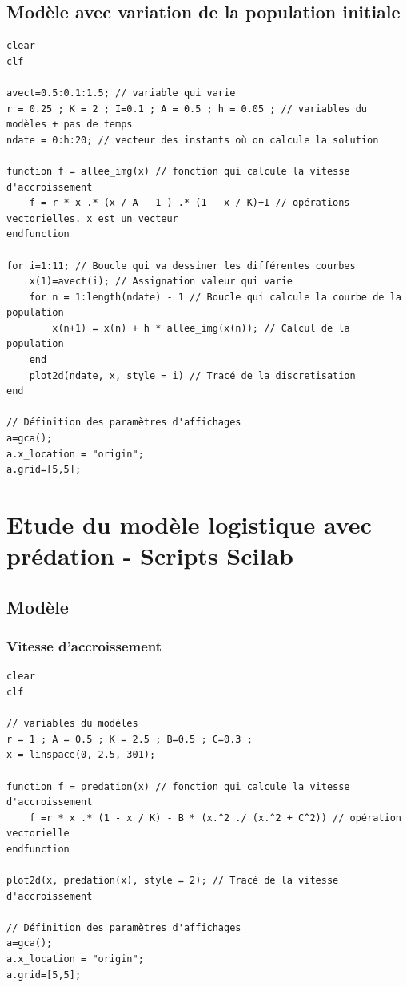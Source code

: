 \documentclass{article}
\begin{document}
\subsection{Modèle avec variation de la population initiale}

\begin{verbatim}
clear
clf

avect=0.5:0.1:1.5; // variable qui varie
r = 0.25 ; K = 2 ; I=0.1 ; A = 0.5 ; h = 0.05 ; // variables du modèles + pas de temps
ndate = 0:h:20; // vecteur des instants où on calcule la solution

function f = allee_img(x) // fonction qui calcule la vitesse d'accroissement
    f = r * x .* (x / A - 1 ) .* (1 - x / K)+I // opérations vectorielles. x est un vecteur
endfunction

for i=1:11; // Boucle qui va dessiner les différentes courbes
    x(1)=avect(i); // Assignation valeur qui varie
    for n = 1:length(ndate) - 1 // Boucle qui calcule la courbe de la population
        x(n+1) = x(n) + h * allee_img(x(n)); // Calcul de la population
    end 
    plot2d(ndate, x, style = i) // Tracé de la discretisation
end

// Définition des paramètres d'affichages
a=gca();
a.x_location = "origin";
a.grid=[5,5];
\end{verbatim}

\section{Etude du modèle logistique avec prédation - Scripts Scilab}

\subsection{Modèle}

\subsubsection{Vitesse d'accroissement}

\begin{verbatim}
clear
clf

// variables du modèles
r = 1 ; A = 0.5 ; K = 2.5 ; B=0.5 ; C=0.3 ;
x = linspace(0, 2.5, 301);

function f = predation(x) // fonction qui calcule la vitesse d'accroissement
    f =r * x .* (1 - x / K) - B * (x.^2 ./ (x.^2 + C^2)) // opération vectorielle
endfunction

plot2d(x, predation(x), style = 2); // Tracé de la vitesse d'accroissement

// Définition des paramètres d'affichages
a=gca();
a.x_location = "origin";
a.grid=[5,5];
\end{verbatim}
\end{document}
